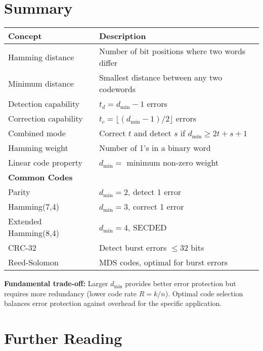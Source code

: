 \section{Summary}

\begin{center}
\begin{tabular}{@{}ll@{}}
\toprule
\textbf{Concept} & \textbf{Description} \\
\midrule
Hamming distance & Number of bit positions where two words differ \\
Minimum distance & Smallest distance between any two codewords \\
Detection capability & $t_d = d_{\min} - 1$ errors \\
Correction capability & $t_c = \lfloor(d_{\min} - 1)/2\rfloor$ errors \\
Combined mode & Correct $t$ and detect $s$ if $d_{\min} \geq 2t + s + 1$ \\
Hamming weight & Number of 1's in a binary word \\
Linear code property & $d_{\min} = $ minimum non-zero weight \\
\midrule
\textbf{Common Codes} & \\
\midrule
Parity & $d_{\min} = 2$, detect 1 error \\
Hamming(7,4) & $d_{\min} = 3$, correct 1 error \\
Extended Hamming(8,4) & $d_{\min} = 4$, SECDED \\
CRC-32 & Detect burst errors $\leq 32$ bits \\
Reed-Solomon & MDS codes, optimal for burst errors \\
\bottomrule
\end{tabular}
\end{center}

\begin{keyconcept}
\textbf{Fundamental trade-off:} Larger $d_{\min}$ provides better error protection but requires more redundancy (lower code rate $R = k/n$). Optimal code selection balances error protection against overhead for the specific application.
\end{keyconcept}

\section{Further Reading}


